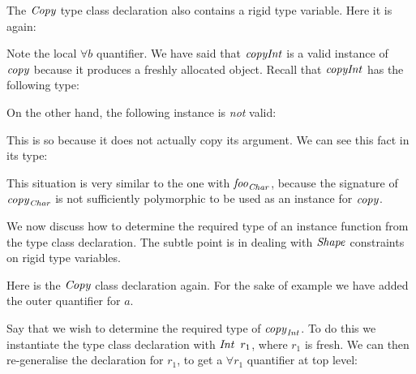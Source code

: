 The $\operatorname{\mathit{Copy}}$ type class declaration also contains a rigid type variable. Here it is again:


Note the local $\forall b$ quantifier. We have said that $\operatorname{\mathit{copyInt}}$ is a valid instance of $\operatorname{\mathit{copy}}$ because it produces a freshly allocated object. Recall that $\operatorname{\mathit{copyInt}}$ has the following type:


On the other hand, the following instance is \emph{not} valid:


This is so because it does not actually copy its argument. We can see this fact in its type:


This situation is very similar to the one with $\operatorname{\mathit{foo}}_{\operatorname{\mathit{Char}}}$, because the signature of $\operatorname{\mathit{copy}}_{\operatorname{\mathit{Char}}}$ is not sufficiently polymorphic to be used as an instance for $\operatorname{\mathit{copy}}$. 

We now discuss how to determine the required type of an instance function from the type class declaration. The subtle point is in dealing with $\operatorname{\mathit{Shape}}$ constraints on rigid type variables.

Here is the $\operatorname{\mathit{Copy}}$ class declaration again. For the sake of example we have added the outer quantifier for $a$.


Say that we wish to determine the required type of $\operatorname{\mathit{copy}}_{\operatorname{\mathit{Int}}}$. To do this we instantiate the type class declaration with $\iInt \ r_1$, where $r_1$ is fresh. We can then re-generalise the declaration for $r_1$, to get a $\forall r_1$ quantifier at top level:

